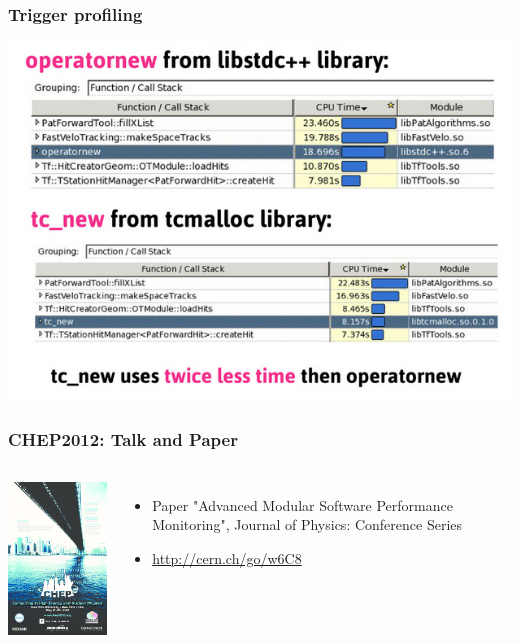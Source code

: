 \documentclass{beamer}
\begin{document}
\begin{frame}
\frametitle{Trigger profiling}
\includegraphics[width=\textwidth]{images/hlt.png}
\end{frame}
\begin{frame}
\frametitle{CHEP2012: Talk and Paper}
\begin{columns}[c]
\includegraphics[width=45mm]{images/chep.png}
\begin{itemize}
    \item Paper "Advanced Modular Software Performance Monitoring", Journal of Physics: Conference Series
    \item \href{http://cern.ch/go/w6C8}{http://cern.ch/go/w6C8}
\end{itemize}
\end{columns}
\end{frame}
\end{document}
